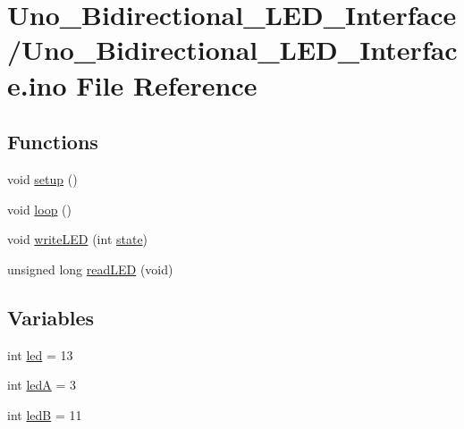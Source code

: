 \hypertarget{Uno__Bidirectional__LED__Interface_8ino}{\section{Uno\-\_\-\-Bidirectional\-\_\-\-L\-E\-D\-\_\-\-Interface/\-Uno\-\_\-\-Bidirectional\-\_\-\-L\-E\-D\-\_\-\-Interface.ino File Reference}
\label{Uno__Bidirectional__LED__Interface_8ino}
}
\subsection*{Functions}
\begin{DoxyCompactItemize}
\item 
void \hyperlink{Uno__Bidirectional__LED__Interface_8ino_a4fc01d736fe50cf5b977f755b675f11d}{setup} ()
\item 
void \hyperlink{Uno__Bidirectional__LED__Interface_8ino_afe461d27b9c48d5921c00d521181f12f}{loop} ()
\item 
void \hyperlink{Uno__Bidirectional__LED__Interface_8ino_a9e94a2a0386f51e0ef74b6aa0181bce7}{write\-L\-E\-D} (int \hyperlink{Uno__MultiWii__HardwarePlatform__Test_2Sensors_8cpp_a0b57aa10271a66f3dc936bba1d2f3830}{state})
\item 
unsigned long \hyperlink{Uno__Bidirectional__LED__Interface_8ino_a6a1b476538d4b24b4dd20bb89db3b3d0}{read\-L\-E\-D} (void)
\end{DoxyCompactItemize}
\subsection*{Variables}
\begin{DoxyCompactItemize}
\item 
int \hyperlink{Uno__Bidirectional__LED__Interface_8ino_a8c935df72ad1a7236c9879fb14aa0d43}{led} = 13
\item 
int \hyperlink{Uno__Bidirectional__LED__Interface_8ino_a02f6891e4a2b8915d17864f25b362e12}{led\-A} = 3
\item 
int \hyperlink{Uno__Bidirectional__LED__Interface_8ino_a3fb1ae61addf2813230fc595bb1ba07c}{led\-B} = 11
\end{DoxyCompactItemize}


